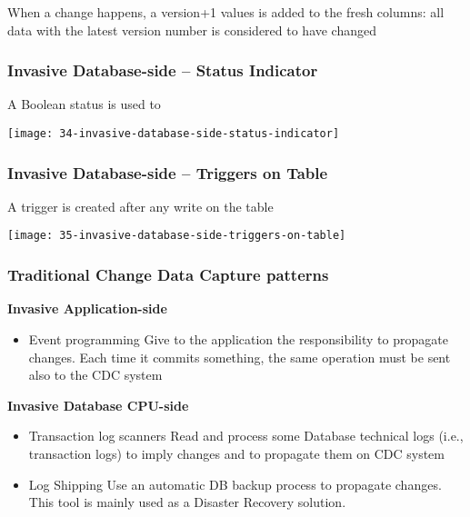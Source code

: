When a change happens, a version+1 values is added to the fresh columns: all data with the latest version number is considered to have changed

\begin{center}
\end{center}

\subsubsection{Invasive Database-side – Status Indicator}

A Boolean status is used to 

\begin{center}
\texttt{[image: 34-invasive-database-side-status-indicator]}
\end{center}

\subsubsection{Invasive Database-side – Triggers on Table}

A trigger is created after any write on the table

\begin{center}
\texttt{[image: 35-invasive-database-side-triggers-on-table]}
\end{center}

\subsubsection{Traditional Change Data Capture patterns}

\textbf{Invasive Application-side}

\begin{itemize}
	\item Event programming
	Give to the application the responsibility to propagate changes. Each time it commits something, the same operation must be sent also to the CDC system
\end{itemize}

\textbf{Invasive Database CPU-side}

\begin{itemize}
	\item Transaction log scanners
	Read and process some Database technical logs (i.e., transaction logs) to imply changes and to propagate them on CDC system
	\item Log Shipping
	Use an automatic DB backup process to propagate changes. This tool is mainly used as a Disaster Recovery solution.
\end{itemize}

